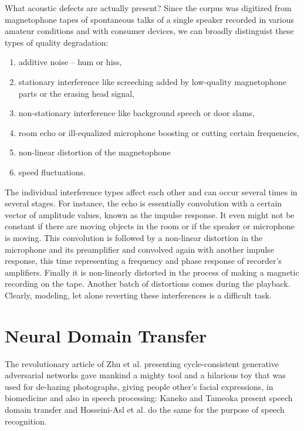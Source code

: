 \documentclass[runningheads,a4paper]{llncs}
\begin{document}
What acoustic defects are actually present? Since the corpus was digitized from
magnetophone tapes of spontaneous talks of a single speaker recorded in various
amateur conditions and with consumer devices, we can broadly distinguist these
types of quality degradation:
\begin{enumerate}
\item{additive noise -- hum or hiss,}
\item{
    stationary interference like screeching added by low-quality magnetophone
    parts or the erasing head signal,
}
\item{non-stationary interference like background speech or door slams,}
\item{
    room echo or ill-equalized microphone boosting or cutting certain
    frequencies,
}
\item{non-linear distortion of the magnetophone}
\item{speed fluctuations.}
\end{enumerate}

The individual interference types affect each other and can occur several times
in several stages. For instance, the echo is essentially convolution with a certain vector of
amplitude values, known as the impulse response. It even might not be
constant if there are moving objects in the room or if the speaker or
microphone is moving. This convolution is followed by a non-linear
distortion in the microphone and its preamplifier and convolved again with
another impulse response, this time representing a frequency and phase
response of recorder's amplifiers. Finally it is non-linearly distorted in
the process of making a magnetic recording on the tape. Another batch of distortions
comes during the playback. Clearly, modeling, let alone reverting these
interferences is a difficult task.

\section{Neural Domain Transfer}

The revolutionary article of Zhu et al.\cite{cyclegan} presenting
cycle-consistent generative adversarial networks gave mankind a mighty tool and
a hilarious toy that was used for de-hazing
photographs\cite{Engin_2018_CVPR_Workshops}, giving people other's facial
expressions\cite{jin2017faceoff}, in biomedicine\cite{yang2018biogan} and also
in speech processing: Kaneko and Tameoka\cite{kaneko2017parallel} present
speech domain transfer and Hosseini-Asl et al.\cite{hosseini2018malevoicegan} do
the same for the purpose of speech recognition.
\end{document}
